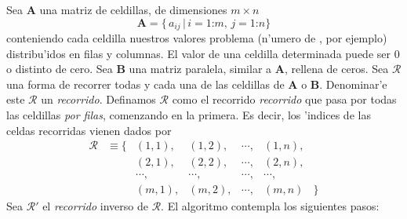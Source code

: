 Sea $\mathbf{A}$ una matriz de celdillas, de dimensiones $m \times n$
%
\begin{equation}
\mathbf{A} = \{ \, a_{ij} \,|\, i=1\mathord{:}m,\, j=1\mathord{:}n \}
\label{eq:arrayA}
\end{equation}
%
conteniendo cada celdilla nuestros valores problema (n'umero de \phes,
por ejemplo) distribu'idos en filas y columnas.  El valor de una
celdilla determinada puede ser $0$ o distinto de cero.  Sea
$\mathbf{B}$ una matriz paralela, similar a 
$\mathbf{A}$, rellena de ceros. Sea $\mathcal{R}$ una forma de
recorrer todas y cada una de las celdillas de $\mathbf{A}$ o
$\mathbf{B}$.  Denominar'e este
$\mathcal{R}$ un \emph{recorrido}.  Definamos $\mathcal{R}$ como el
recorrido \emph{recorrido} que pasa por todas las celdillas \emph{por filas},
comenzando en la primera.  Es decir, los 'indices de las celdas
recorridas vienen dados por
%
\begin{equation}
  \begin{matrix}
    \mathcal{R} &\equiv \{ & (1,1),& (1,2),&\cdots,& (1,n),& \\
                &          & (2,1),& (2,2),&\cdots,& (2,n),& \\
                &          &\cdots,&\cdots,&\cdots,&\cdots,& \\
                &          & (m,1),& (m,2),&\cdots,& (m,n) & \}
  \end{matrix}
  \label{eq:journey}
\end{equation}
%
Sea $\mathcal{R}'$ el \emph{recorrido} inverso de $\mathcal{R}$.  El
algoritmo contempla los siguientes pasos:

